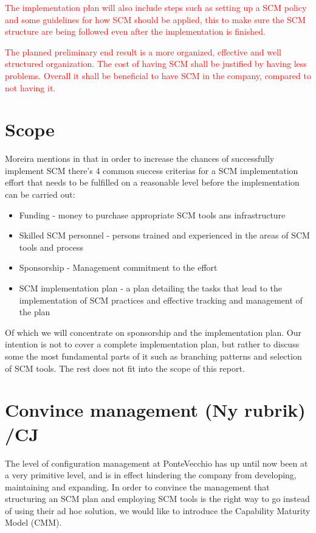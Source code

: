 \documentclass[10pt]{article}
\newcommand\remove[1]{\textcolor{red}{#1}}
\begin{document}
\noindent \remove{The implementation plan will also include steps such as setting up a SCM policy and some guidelines for how SCM should be applied, this to make sure the SCM structure are being followed even after the implementation is finished.}

\noindent \remove{The planned preliminary end result is a more organized, effective and well structured organization. The cost of having SCM shall be justified by having less problems. Overall it shall be beneficial to have SCM in the company, compared to not having it.}

\section{Scope}
Moreira mentions in \cite{Moreira} that in order to increase the chances of successfully implement SCM there's 4 common success criterias for a SCM implementation effort that needs to be fulfilled on a reasonable level before the implementation can be carried out:
\begin{itemize}
\item Funding - money to purchase appropriate SCM tools ans infrastructure
\item Skilled SCM personnel - persons trained and experienced in the areas of SCM tools and process
\item Sponsorship - Management commitment to the effort
\item SCM implementation plan - a plan detailing the tasks that lead to the implementation of SCM practices and effective tracking and management of the plan
\end{itemize}
Of which we will concentrate on sponsorship and the implementation plan. Our intention is not to cover a complete implementation plan, but rather to discuss some the most fundamental parts of it such as branching patterns and selection of SCM tools. The rest does not fit into the scope of this report.
 
\section{Convince management (Ny rubrik) /CJ}
The level of configuration management at PonteVecchio has up until now been at a very primitive level, and is in effect hindering the company from developing, maintaining and expanding. In order to convince the management that structuring an SCM plan and employing SCM tools is the right way to go instead of using their ad hoc solution, we would like to introduce the Capability Maturity Model (CMM). 
\end{document}
